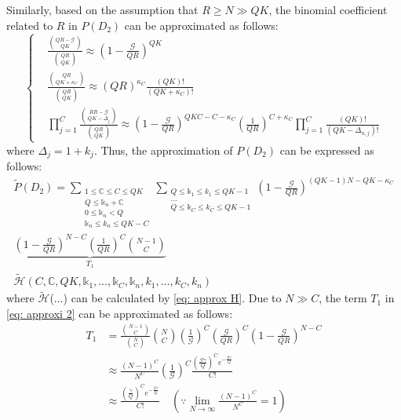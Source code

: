 \documentclass[a4paper]{IEEEtran}
\begin{document}
Similarly, based on the assumption that $R \geq N \gg QK$, the binomial coefficient related to $R$ in $P(D_2)$ can be approximated as follows:
\begin{equation}
\left\{
\begin{aligned}
&\frac{{QR - \mathcal{G} \choose QK}}{{QR \choose QK}} \approx (1 - \frac{\mathcal{G}}{QR})^{QK}\\
&\frac{{QR \choose QK + \kappa_{C}}}{{QR \choose QK}} 
\approx (QR)^{\kappa_{C}} \frac{(QK)!}{(QK + \kappa_{C})!}
\\
&\prod^{C}_{j = 1}\frac{{RR - \mathcal{G} \choose QK - \Delta_j}}{{QR \choose QK}} \approx
\left(1 - \frac{\mathcal{G}}{QR}\right)^{QKC - C - \kappa_{C}} 
\left(\frac{1}{QR}\right)^{C + \kappa_{C}}
\prod^{C}_{j = 1}\frac{(QK)!}{(QK - \Delta_{n,j})!} 
\end{aligned}
\right.
\end{equation}
where $\Delta_{j} = 1 + k_j$. Thus, the approximation of $P(D_2)$ can be expressed as follows:
\begin{multline}
\widetilde{P}(D_2) = 
\sum\limits_{
\substack{
1 \leq \mathbb{C} \leq C \leq QK\\
Q \leq \mathbb{k}_n + \mathbb{C}\\
0 \leq \mathbb{k}_n < Q\\
\mathbb{k}_n \leq k_n \leq QK - C
}
}
\sum\limits_{
\substack{
Q \leq \mathbb{k}_1 \leq k_1 \leq QK - 1\\
\dots\\
Q \leq \mathbb{k}_C \leq k_C \leq QK - 1
}}
\left(1 - \frac{ \mathcal{G} }{QR}\right)^{(QK-1)N - QK -\kappa_{C}}\\
\underbrace{
\left(1 - \frac{\mathcal{G} }{QR}\right)^{N-{C}} \left(\frac{1}{QR}\right)^{{C}} {N-1 \choose C} }_{T_{1}} \\
\widetilde{\mathcal{H}}(C, \mathbb{C}, QK, \mathbb{k}_{1}, \dots, \mathbb{k}_{C}, \mathbb{k}_{n}, k_{1}, \dots, k_{C}, k_{n}) 
\label{eq: approxi 2}
\end{multline}
where $\widetilde{\mathcal{H}}$($\dots$) can be calculated by \eqref{eq: approx H}. Due to $N \gg C$, the term $T_1$ in \eqref{eq: approxi 2} can be approximated as follows:
\begin{equation}
\begin{split}
T_{1} &
= \frac{{N-1 \choose C}}{{N \choose {C}}}{N \choose {C}}\left(\frac{1}{\mathcal{G}}\right)^{{C}}
\left(\frac{\mathcal{G}}{QR}\right)^{{C}}\left(1-\frac{\mathcal{G}}{QR}\right)^{N - {C}}\\
&\approx
\frac{(N-1)^{C}}{N^{C}}\left(\frac{1}{\mathcal{G}}\right)^{{C}} 
\frac{(\frac{\mathcal{G}\gamma}{Q})^{{C}} 
e^{-\frac{\mathcal{G}\gamma}{Q}}}
{{C}!}\\
&\approx \frac{(\frac{\gamma}{Q})^{{C}}e^{-\frac{\mathcal{G}\gamma}{Q}}}{C!} \quad (\because \lim_{N\to\infty} \frac{(N-1)^{C}}{N^{{C}}} = 1)
\label{eq: T1}
\end{split}
\end{equation}
\end{document}
